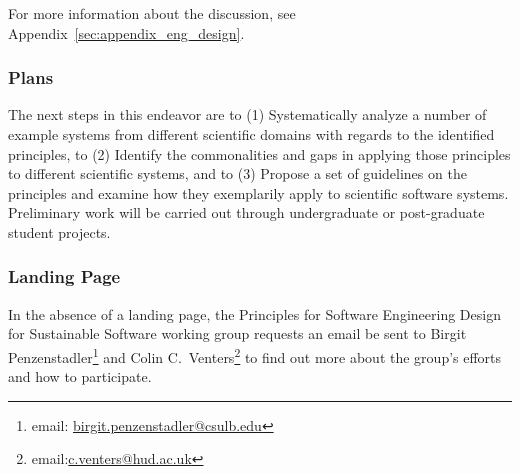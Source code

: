 For more information about the discussion, see Appendix~\ref{sec:appendix_eng_design}.

\subsubsection{Plans}

The next steps in this endeavor are to (1) Systematically analyze a number of
example systems from different scientific domains with regards to the identified
principles, to (2) Identify the commonalities and gaps in applying those
principles to different scientific systems, and to (3) Propose a set of
guidelines on the principles and examine how they exemplarily apply to scientific software
systems. Preliminary work will be carried out through undergraduate or
post-graduate student projects.

\subsubsection{Landing Page}

In the absence of a landing page, the Principles for Software Engineering Design
for Sustainable Software working group requests an email be sent to Birgit
Penzenstadler\footnote{email:
\href{mailto:birgit.penzenstadler@csulb.edu}{birgit.penzenstadler@csulb.edu}}
and Colin C.\
Venters\footnote{email:\href{mailto:c.venters@hud.ac.uk}{c.venters@hud.ac.uk}}
to find out more about the group's efforts and how to participate.
